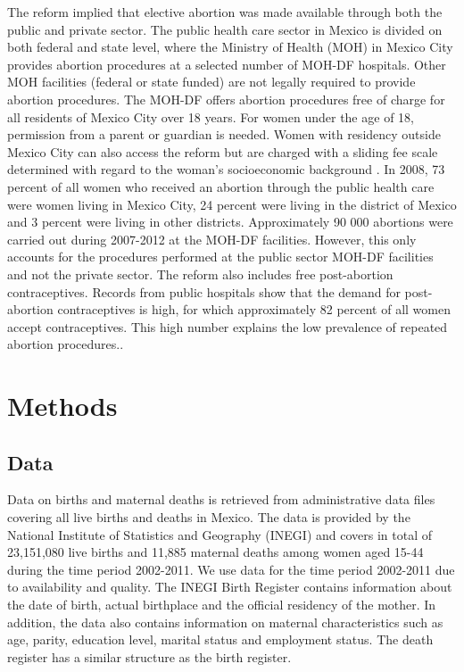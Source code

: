 \documentclass[a4paper, 11pt]{article}
\begin{document}
\begin{spacing}{1.5}
\begin{multicols}{2}
 The reform implied that elective abortion was made available through both the public and private sector. The public health care sector in Mexico is divided on both federal and state level, where the Ministry of Health (MOH) in Mexico City provides abortion procedures at a selected number of MOH-DF hospitals. Other MOH facilities (federal or state funded) are not legally required to provide abortion procedures. The MOH-DF offers abortion procedures free of charge for all residents of Mexico City over 18 years. For women under the age of 18, permission from a parent or guardian is needed. Women with residency outside Mexico City can also access the reform but are charged with a sliding fee scale determined with regard to the woman's socioeconomic background \citep{Kalb}. In 2008, 73 percent of all women who received an abortion through the public health care were women living in Mexico City, 24 percent were living in the district of Mexico and 3 percent were living in other districts. Approximately 90 000 abortions were carried out during 2007-2012 at the MOH-DF facilities. However, this only accounts for the procedures performed at the public sector MOH-DF facilities and not the private sector. The reform also includes free post-abortion contraceptives. Records from public hospitals show that the demand for post-abortion contraceptives is high, for which approximately 82 percent of all women accept contraceptives. This high number explains the low prevalence of repeated abortion procedures.\citep{Becker}. 
 

\section{Methods}
\subsection{Data}
 Data on births and maternal deaths is retrieved from administrative data files covering all live births and deaths in Mexico. The data is provided by the National Institute of Statistics and Geography (INEGI) and covers in total of 23,151,080 live births and 11,885 maternal deaths among women aged 15-44 during the time period 2002-2011. We use data for the time period 2002-2011 due to availability and quality. The INEGI Birth Register contains information about the date of birth, actual birthplace and the official residency of the mother. In addition, the data also contains information on maternal characteristics such as age, parity, education level, marital status and employment status. The death register has a similar structure as the birth register.
 

\end{multicols}
\end{spacing}
\end{document}
